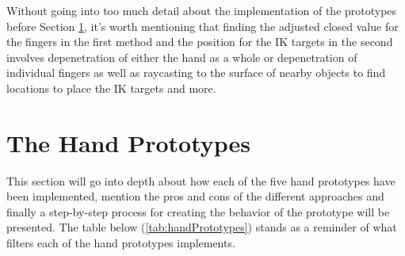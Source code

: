 Without going into too much detail about the implementation of the prototypes before Section \ref{sec:handPrototypes}, it's worth mentioning that finding the adjusted closed value for the fingers in the first method and the position for the IK targets in the second involves depenetration of either the hand as a whole or depenetration of individual fingers as well as raycasting to the surface of nearby objects to find locations to place the IK targets and more.

\section{The Hand Prototypes}
\label{sec:handPrototypes}
This section will go into depth about how each of the five hand prototypes have been implemented, mention the pros and cons of the different approaches and finally a step-by-step process for creating the behavior of the prototype will be presented. The table below (\ref{tab:handPrototypes}) stands as a reminder of what filters each of the hand prototypes implements.

\begin{table}[H]
\centering
\caption{The hand prototypes and their filters.}
\label{tab:handPrototypes}
\end{table}


